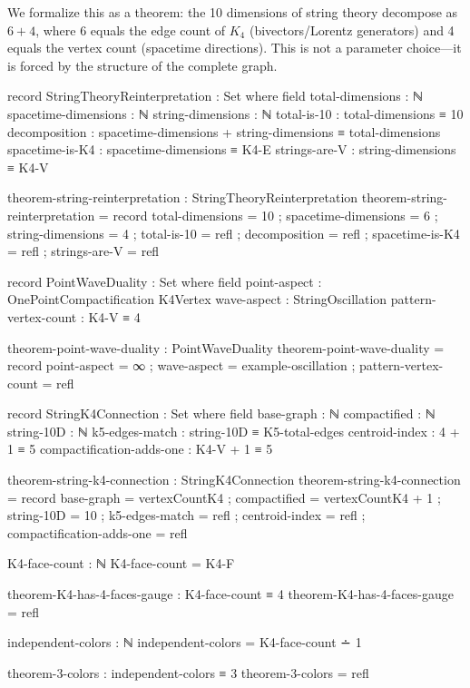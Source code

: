 \documentclass[11pt,a4paper]{book}
\begin{document}
We formalize this as a theorem: the 10 dimensions of string theory decompose as 
$6 + 4$, where 6 equals the edge count of $K_4$ (bivectors/Lorentz generators) and 
4 equals the vertex count (spacetime directions). This is not a parameter choice---it 
is forced by the structure of the complete graph.

\begin{code}
record StringTheoryReinterpretation : Set where
  field
    total-dimensions : ℕ
    spacetime-dimensions : ℕ
    string-dimensions : ℕ
    total-is-10 : total-dimensions ≡ 10
    decomposition : spacetime-dimensions + string-dimensions ≡ total-dimensions
    spacetime-is-K4 : spacetime-dimensions ≡ K4-E
    strings-are-V : string-dimensions ≡ K4-V

theorem-string-reinterpretation : StringTheoryReinterpretation
theorem-string-reinterpretation = record
  { total-dimensions = 10
  ; spacetime-dimensions = 6
  ; string-dimensions = 4
  ; total-is-10 = refl
  ; decomposition = refl
  ; spacetime-is-K4 = refl
  ; strings-are-V = refl
  }

\end{code}

\begin{code}
record PointWaveDuality : Set where
  field
    point-aspect : OnePointCompactification K4Vertex
    wave-aspect : StringOscillation
    pattern-vertex-count : K4-V ≡ 4

theorem-point-wave-duality : PointWaveDuality
theorem-point-wave-duality = record
  { point-aspect = ∞
  ; wave-aspect = example-oscillation
  ; pattern-vertex-count = refl
  }
\end{code}

\begin{code}
record StringK4Connection : Set where
  field
    base-graph : ℕ
    compactified : ℕ
    string-10D : ℕ
    k5-edges-match : string-10D ≡ K5-total-edges
    centroid-index : 4 + 1 ≡ 5
    compactification-adds-one : K4-V + 1 ≡ 5

theorem-string-k4-connection : StringK4Connection
theorem-string-k4-connection = record
  { base-graph = vertexCountK4
  ; compactified = vertexCountK4 + 1
  ; string-10D = 10
  ; k5-edges-match = refl
  ; centroid-index = refl
  ; compactification-adds-one = refl
  }
\end{code}

\begin{code}
K4-face-count : ℕ
K4-face-count = K4-F

theorem-K4-has-4-faces-gauge : K4-face-count ≡ 4
theorem-K4-has-4-faces-gauge = refl

independent-colors : ℕ
independent-colors = K4-face-count ∸ 1

theorem-3-colors : independent-colors ≡ 3
theorem-3-colors = refl
\end{code}
\end{document}
